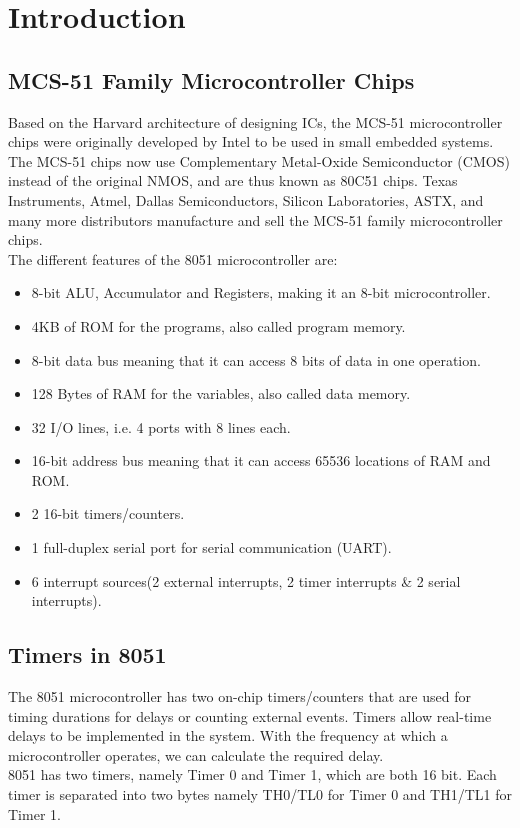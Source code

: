 \documentclass{lab_sheet}
\begin{document}
    \tableofcontents
    \pagebreak
    \listoffigures
    \pagebreak
    \listoftables
    \pagebreak
    \lstlistoflistings
    \pagebreak
    \section{Introduction}
    \subsection{MCS-51 Family Microcontroller Chips}
    Based on the Harvard architecture of designing ICs, the MCS-51 microcontroller chips were originally developed by Intel to be used in small embedded systems. The MCS-51 chips now use Complementary Metal-Oxide Semiconductor (CMOS) instead of the original NMOS, and are thus known as 80C51 chips. Texas Instruments, Atmel, Dallas Semiconductors, Silicon Laboratories, ASTX, and many more distributors manufacture and sell the MCS-51 family microcontroller chips.\\
    The different features of the 8051 microcontroller are: 
    \begin{itemize}
        \item 8-bit ALU, Accumulator and Registers, making it an 8-bit microcontroller.
        \item 4KB of ROM for the programs, also called program memory.
        \item 8-bit data bus meaning that it can access 8 bits of data in one operation.
        \item 128 Bytes of RAM for the variables, also called data memory.
        \item 32 I/O lines, i.e. 4 ports with 8 lines each.
        \item 16-bit address bus meaning that it can access 65536 locations of RAM and ROM.
        \item 2 16-bit timers/counters.
        \item 1 full-duplex serial port for serial communication (UART).
        \item 6 interrupt sources(2 external interrupts, 2 timer interrupts \& 2 serial interrupts).
        \end{itemize}
        \subsection{Timers in 8051}
        The 8051 microcontroller has two on-chip timers/counters that are used for timing durations for delays or counting external events. Timers allow real-time delays to be implemented in the system. With the frequency at which a microcontroller operates, we can calculate the required delay.\\
        8051 has two timers, namely Timer 0 and Timer 1, which are both 16 bit. Each timer is separated into two bytes namely TH0/TL0 for Timer 0 and TH1/TL1 for Timer 1.
\end{document}
